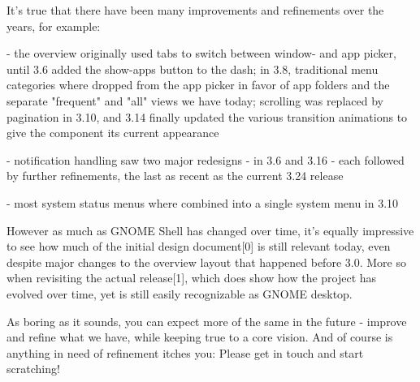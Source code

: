 \documentclass[10pt, a5paper]{article}
\begin{document}
\begin{Parallel}[p]{}{}
{\a It's true that there have been many improvements and refinements over the years, for example:

 - the overview originally used tabs to switch between window- and
   app picker, until 3.6 added the show-apps button to the dash; in
   3.8, traditional menu categories where dropped from the app picker
   in favor of app folders and the separate "frequent" and "all" views
   we have today; scrolling was replaced by pagination in 3.10, and 3.14
   finally updated the various transition animations to give the component
   its current appearance

 - notification handling saw two major redesigns - in 3.6 and 3.16 - each
   followed by further refinements, the last as recent as the current 3.24
   release

 - most system status menus where combined into a single system menu in 3.10

However as much as GNOME Shell has changed over time, it's equally impressive to see how much of the initial design document[0] is still relevant today, even despite major changes to the overview layout that happened before 3.0. More so when revisiting the actual release[1], which does show how the project has evolved over time, yet is still easily recognizable as GNOME desktop.

As boring as it sounds, you can expect more of the same in the future - improve and refine what we have, while keeping true to a core vision. And of course is anything in need of refinement itches you: Please get in touch and start scratching!
     }
\end{Parallel}
\end{document}
